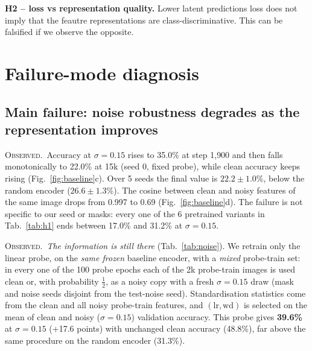\documentclass[10pt]{article}
\newcommand{\obs}{\textsc{Observed.}~}
\begin{document}
\textbf{H2 -- loss vs representation quality.} 
Lower latent predictions loss does not imply that the feautre representations are class-discriminative. 
This can be falsified if we observe the opposite.

\section{Failure-mode diagnosis}
\label{sec:failure}
\subsection{Main failure: noise robustness degrades as the representation improves}
\obs Accuracy at $\sigma{=}0.15$ rises to 35.0\% at step 1{,}900 and then falls monotonically to 22.0\% at 15k (seed 0,
fixed probe), while clean accuracy keeps rising (Fig.~\ref{fig:baseline}c). Over 5 seeds the final value is $22.2{\pm}1.0$\%,
below the random encoder ($26.6{\pm}1.3$\%). 
The cosine between clean and noisy features of the same image drops from 0.997 to 0.69
(Fig.~\ref{fig:baseline}d). The failure is not specific to our seed or masks: every one of the 6 pretrained variants in
Tab.~\ref{tab:h1} ends between 17.0\% and 31.2\% at $\sigma{=}0.15$.

\obs \emph{The information is still there} (Tab.~\ref{tab:noise}). We retrain only the linear probe, on the \emph{same
frozen} baseline encoder, with a \emph{mixed} probe-train set: in every one of the 100 probe epochs each of the 2k probe-train
images is used clean or, with probability $\tfrac12$, as a noisy copy with a fresh $\sigma{=}0.15$ draw (mask and noise
seeds disjoint from the test-noise seed). Standardisation statistics come from the clean and all noisy probe-train features,
and $(\mathrm{lr},\mathrm{wd})$ is selected on the mean of clean and noisy ($\sigma{=}0.15$) validation accuracy. This probe
gives \textbf{39.6\%} at $\sigma{=}0.15$ (+17.6 points) with unchanged clean accuracy (48.8\%), far above the same procedure
on the random encoder (31.3\%).
\end{document}
